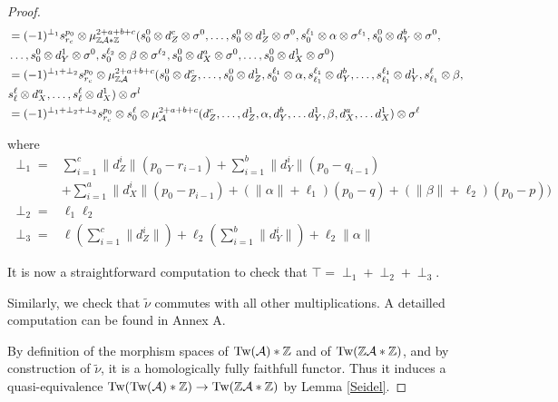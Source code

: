 \documentclass[12pt]{article}
\begin{document}
\begin{proof}
		\begin{align*}
			&= (-1)^{\perp_1} s^{p_0}_{r_c} \otimes \mu_{\mathbb{Z} {\cal{A}} * \mathbb{Z}}^{2+a+b+c}(s^0_0 \otimes d_Z^c \otimes \sigma^0, \dots, s^0_0 \otimes d_Z^1 \otimes \sigma^0,s^{\ell_1}_0 \otimes \alpha \otimes \sigma^{\ell_1},s^0_0 \otimes d_Y^b \otimes \sigma^0, \\
			&\dots, s^0_0 \otimes d_Y^1 \otimes \sigma^0, s^{\ell_2}_0 \otimes \beta \otimes \sigma^{\ell_2}, s^0_0 \otimes d_X^a \otimes \sigma^0, \dots, s^0_0 \otimes d_X^1 \otimes \sigma^0) \\
			&= (-1)^{\perp_1 + \perp_2} s^{p_0}_{r_c} \otimes \mu_{\mathbb{Z} {\cal{A}}}^{2+a+b+c}(s^0_0 \otimes d_Z^c, \dots, s^0_0 \otimes d_Z^1,s^{\ell_1}_0 \otimes \alpha,s^{\ell_1}_{\ell_1} \otimes d_Y^b, \dots, s^{\ell_1}_{\ell_1} \otimes d_Y^1, s^{\ell}_{\ell_1} \otimes \beta, \\
			&s^\ell_\ell \otimes d_X^a, \dots, s^\ell_\ell \otimes d_X^1) \otimes \sigma^l \\
			&= (-1)^{\perp_1 + \perp_2 + \perp_3} s^{p_0}_{r_c} \otimes s^\ell_0 \otimes \mu_{\cal{A}}^{2+a+b+c}(d_Z^c, \dots, d_Z^1, \alpha, d_Y^b, \dots d_Y^1, \beta, d_X^a, \dots d_X^1) \otimes \sigma^\ell
		\end{align*}
		
		where 
		\begin{align*}\perp_1= &\sum_{i=1}^{c} \| d_Z^i\| (p_0 - r_{i-1}) + \sum_{i=1}^{b} \| d_Y^i\|(p_0 - q_{i-1}) \\
			&+ \sum_{i=1}^{a} \| d_X^i\|(p_0 - p_{i-1}) + (\| \alpha \| + \ell_1) (p_0 - q) + (\| \beta \| + \ell_2)(p_0 - p)) \\
		\perp_2= & \ell_1 \ell_2 \\
		\perp_3= & \ell (\sum_{i=1}^{c} \| d_Z^i \|) + \ell_2(\sum_{i=1}^{b} \| d_Y^i \|) + \ell_2 \|\alpha \|
	\end{align*}
		
		\noindent It is now a straightforward computation to check that $\top = \perp_1 + \perp_2 + \perp_3$. 
		
		\noindent Similarly, we check that $\tilde{\nu}$ commutes with all other multiplications. A detailled computation can be found in Annex A.
		
		\noindent By definition of the morphism spaces of $\textup{Tw}({\cal{A}})* \mathbb{Z}$ and of $\textup{Tw}(\mathbb{Z}{\cal{A}} * \mathbb{Z})$, and by construction of $\tilde{\nu}$, it is a homologically fully faithfull functor. Thus it induces a quasi-equivalence $\textup{Tw}(\textup{Tw}({\cal{A}})* \mathbb{Z}) \to \textup{Tw}(\mathbb{Z} {\cal{A}} * \mathbb{Z})$ by Lemma \ref{Seidel}.
	\end{proof}
	
\end{document}
